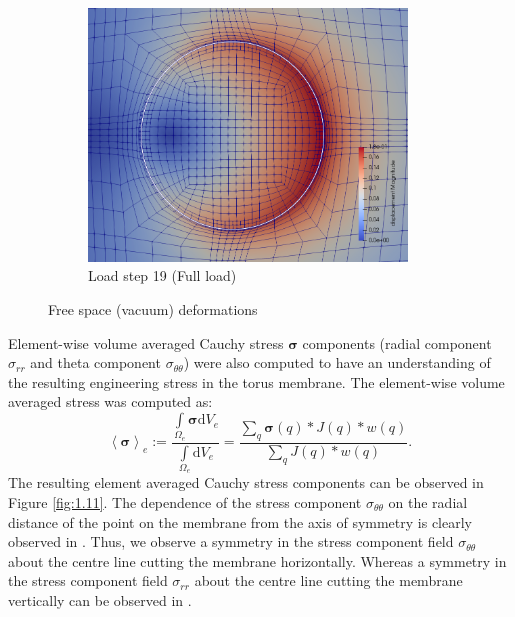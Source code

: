 \documentclass[11pt,a4paper,final]{article}
\begin{document}
\begin{figure}[h!]
\begin{subfigure}[b]{0.32\textwidth}
\includegraphics[width=0.93\textwidth]{vacuum_deformations_full_load.png}
\caption{Load step 19 (Full load)}
\label{fig:1.10.3}
\end{subfigure}
\caption{Free space (vacuum) deformations}
\label{fig:1.10}
\end{figure}

Element-wise volume averaged Cauchy stress $\bm{\sigma}$ components (radial component $\sigma_{rr}$ and theta component $\sigma_{\theta \theta}$) were also computed to have an understanding of the resulting engineering stress in the torus membrane. The element-wise volume averaged stress was computed as:
\begin{equation}
\left\langle \bm{\sigma} \right\rangle_e := \dfrac{\int\limits_{\Omega_{e}} \bm{\sigma} \mathrm{d}V_e}{\int\limits_{\Omega_{e}} \mathrm{d}V_e} = \dfrac{\sum\limits_{q} \bm{\sigma}(q) * J(q) * w(q)}{\sum\limits_{q} J(q) * w(q)}.
\end{equation}  
The resulting element averaged Cauchy stress components can be observed in Figure \eqref{fig:1.11}. The dependence of the stress component $\sigma_{\theta \theta}$ on the radial distance of the point on the membrane from the axis of symmetry is clearly observed in . Thus, we observe a symmetry in the stress component field $\sigma_{\theta \theta}$ about the centre line cutting the membrane horizontally. Whereas a symmetry in the stress component field $\sigma_{rr}$ about the centre line cutting the membrane vertically can be observed in . \par 
 
\end{document}
